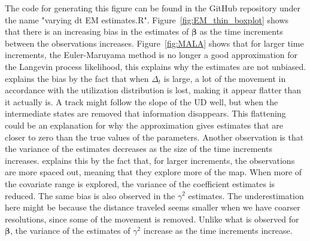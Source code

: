 The code for generating this figure can be found in the GitHub repository under the name "varying dt EM estimates.R". Figure~\ref{fig:EM_thin_boxplot} shows that there is an increasing bias in the estimates of $\bm \beta$ as the time increments between the observations increases. Figure~\ref{fig:MALA} shows that for larger time increments, the Euler-Maruyama method is no longer a good approximation for the Langevin process likelihood, this explains why the estimates are not unbiased. \parencite{michelot_langevin_2019} explains the bias by the fact that when $\Delta_t$ is large, a lot of the movement in accordance with the utilization distribution is lost, making it appear flatter than it actually is. A track might follow the slope of the UD well, but when the intermediate states are removed that information disappears. This flattening could be an explanation for why the approximation gives estimates that are closer to zero than the true values of the parameters. Another observation is that the variance of the estimates decreases as the size of the time increments increases. \parencite{michelot_langevin_2019} explains this by the fact that, for larger increments, the observations are more spaced out, meaning that they explore more of the map. When more of the covariate range is explored, the variance of the coefficient estimates is reduced. The same bias is also observed in the $\gamma^2$ estimates. The underestimation here might be because the distance traveled seems smaller when we have coarser resolutions, since some of the movement is removed. Unlike what is observed for $\bm \beta$, the variance of the estimates of $\gamma^2$ increase as the time increments increase.

